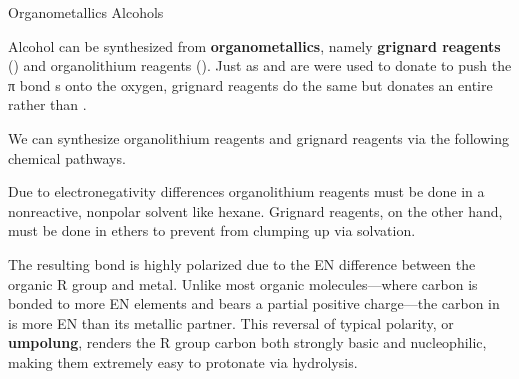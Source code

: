 \documentclass[10pt]{article}
\begin{document}
  \begin{core}{Organometallics \rightarrow Alcohols}
   
    Alcohol can be synthesized from \textbf{organometallics}, namely \textbf{grignard reagents} () and organolithium reagents (). Just as  and  are were used to donate  to push the π bond s onto the oxygen, grignard reagents do the same but donates an entire  rather than .

    We can synthesize organolithium reagents and grignard reagents via the following chemical pathways.



    Due to electronegativity differences organolithium reagents must be done in a nonreactive, nonpolar solvent like hexane. Grignard reagents, on the other hand, must be done in ethers to prevent  from clumping up via solvation. 


    The resulting  bond is highly polarized due to the EN difference between the organic R group and metal. Unlike most organic molecules---where carbon is bonded to more EN elements and bears a partial positive charge---the carbon in  is more EN than its metallic partner. This reversal of typical polarity, or \textbf{umpolung}, renders the R group carbon both strongly basic and nucleophilic, making them extremely easy to protonate via hydrolysis.



\end{core}
\end{document}
